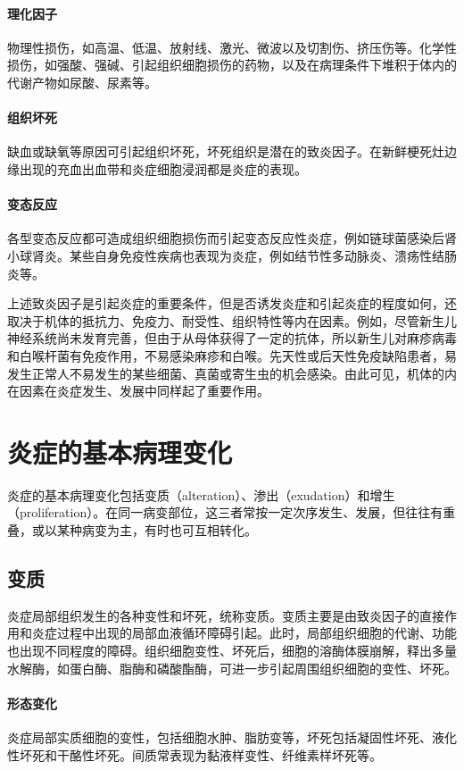 \paragraph{理化因子}
物理性损伤，如高温、低温、放射线、激光、微波以及切割伤、挤压伤等。化学性损伤，如强酸、强碱、引起组织细胞损伤的药物，以及在病理条件下堆积于体内的代谢产物如尿酸、尿素等。

\paragraph{组织坏死}
缺血或缺氧等原因可引起组织坏死，坏死组织是潜在的致炎因子。在新鲜梗死灶边缘出现的充血出血带和炎症细胞浸润都是炎症的表现。

\paragraph{变态反应}
各型变态反应都可造成组织细胞损伤而引起变态反应性炎症，例如链球菌感染后肾小球肾炎。某些自身免疫性疾病也表现为炎症，例如结节性多动脉炎、溃疡性结肠炎等。

上述致炎因子是引起炎症的重要条件，但是否诱发炎症和引起炎症的程度如何，还取决于机体的抵抗力、免疫力、耐受性、组织特性等内在因素。例如，尽管新生儿神经系统尚未发育完善，但由于从母体获得了一定的抗体，所以新生儿对麻疹病毒和白喉杆菌有免疫作用，不易感染麻疹和白喉。先天性或后天性免疫缺陷患者，易发生正常人不易发生的某些细菌、真菌或寄生虫的机会感染。由此可见，机体的内在因素在炎症发生、发展中同样起了重要作用。

\section{炎症的基本病理变化}

炎症的基本病理变化包括变质（alteration）、渗出（exudation）和增生（proliferation）。在同一病变部位，这三者常按一定次序发生、发展，但往往有重叠，或以某种病变为主，有时也可互相转化。

\subsection{变质}

炎症局部组织发生的各种变性和坏死，统称变质。变质主要是由致炎因子的直接作用和炎症过程中出现的局部血液循环障碍引起。此时，局部组织细胞的代谢、功能也出现不同程度的障碍。组织细胞变性、坏死后，细胞的溶酶体膜崩解，释出多量水解酶，如蛋白酶、脂酶和磷酸酯酶，可进一步引起周围组织细胞的变性、坏死。

\paragraph{形态变化}
炎症局部实质细胞的变性，包括细胞水肿、脂肪变等，坏死包括凝固性坏死、液化性坏死和干酪性坏死。间质常表现为黏液样变性、纤维素样坏死等。


